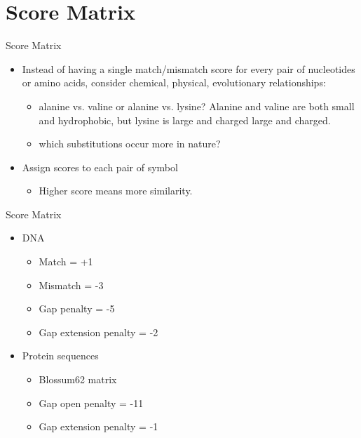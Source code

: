 \documentclass{bredelebeamer}
\begin{document}
\section{Score Matrix}
\begin{frame}{Score Matrix}
   \begin{itemize}
       \item Instead of having a single match/mismatch 
score for every pair of nucleotides or amino 
acids, consider chemical, physical, 
evolutionary relationships:
\begin{itemize}
       \item  alanine vs. valine or alanine vs. lysine? Alanine and valine are both small and hydrophobic, but lysine is large and charged large and charged.
 \item  which substitutions occur more in nature?
   \end{itemize} 
   \item Assign scores to each pair of symbol
\begin{itemize}
 \item   Higher score means more similarity.
   \end{itemize} 
   \end{itemize} 
\end{frame}
\begin{frame}{Score Matrix}
\begin{itemize}
       \item DNA
\begin{itemize}
       \item  Match = +1
        \item  Mismatch = -3
         \item   Gap penalty = -5
          \item  Gap extension penalty = -2

   \end{itemize} 
   \item Protein sequences
\begin{itemize}
 \item Blossum62 matrix
         \item   Gap open penalty = -11
          \item  Gap extension penalty = -1
   \end{itemize} 
   \end{itemize}
\end{frame}
\end{document}
